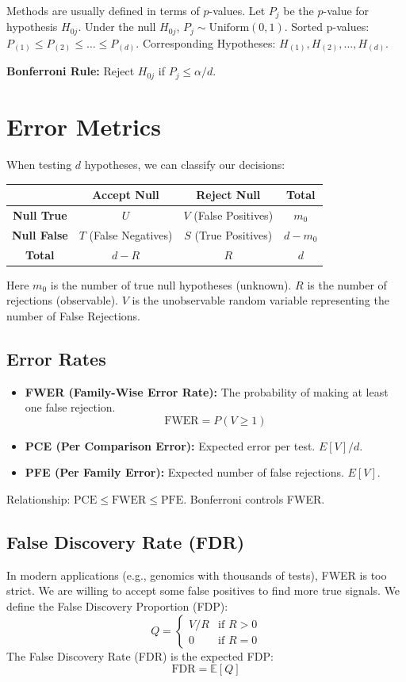 \documentclass[12pt, a4paper]{article}
\theoremstyle{definition}
\newcommand{\E}{\mathbb{E}}
\begin{document}
Methods are usually defined in terms of $p$-values.
Let $P_j$ be the $p$-value for hypothesis $H_{0j}$.
Under the null $H_{0j}$, $P_j \sim \text{Uniform}(0, 1)$.
Sorted p-values: $P_{(1)} \le P_{(2)} \le \dots \le P_{(d)}$.
Corresponding Hypotheses: $H_{(1)}, H_{(2)}, \dots, H_{(d)}$.

\textbf{Bonferroni Rule:} Reject $H_{0j}$ if $P_j \le \alpha/d$.

\section{Error Metrics}

When testing $d$ hypotheses, we can classify our decisions:

\begin{table}[h]
\centering
\begin{tabular}{|c|c|c|c|}
\hline
& \textbf{Accept Null} & \textbf{Reject Null} & \textbf{Total} \\
\hline
\textbf{Null True} & $U$ & $V$ (False Positives) & $m_0$ \\
\hline
\textbf{Null False} & $T$ (False Negatives) & $S$ (True Positives) & $d - m_0$ \\
\hline
\textbf{Total} & $d - R$ & $R$ & $d$ \\
\hline
\end{tabular}
\end{table}

Here $m_0$ is the number of true null hypotheses (unknown). $R$ is the number of rejections (observable). $V$ is the unobservable random variable representing the number of False Rejections.

\subsection{Error Rates}
\begin{itemize}
    \item \textbf{FWER (Family-Wise Error Rate):} The probability of making at least one false rejection.
    $$ \text{FWER} = P(V \ge 1) $$
    \item \textbf{PCE (Per Comparison Error):} Expected error per test. $E[V]/d$.
    \item \textbf{PFE (Per Family Error):} Expected number of false rejections. $E[V]$.
\end{itemize}
Relationship: $\text{PCE} \le \text{FWER} \le \text{PFE}$.
Bonferroni controls FWER.

\subsection{False Discovery Rate (FDR)}
In modern applications (e.g., genomics with thousands of tests), FWER is too strict. We are willing to accept some false positives to find more true signals.
We define the False Discovery Proportion (FDP):
$$ Q = \begin{cases} V/R & \text{if } R > 0 \\ 0 & \text{if } R = 0 \end{cases} $$
The False Discovery Rate (FDR) is the expected FDP:
$$ \text{FDR} = \E[Q] $$
\end{document}
